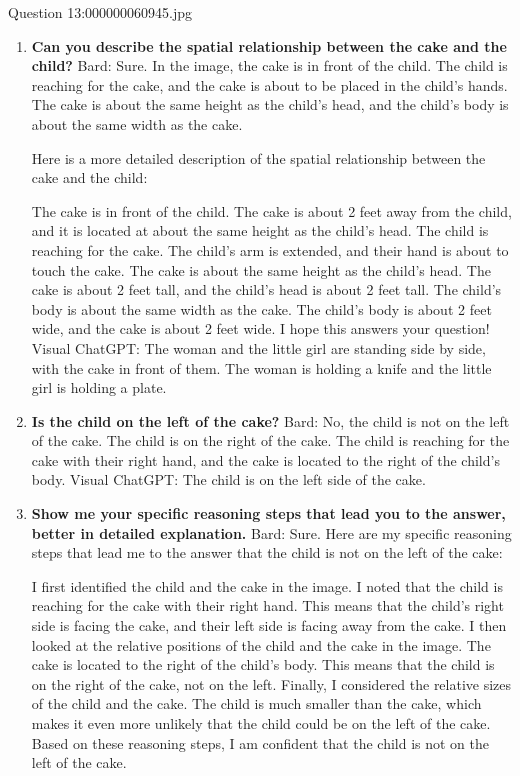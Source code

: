     Question 13:000000060945.jpg
    \begin{enumerate}
        \item \textbf{Can you describe the spatial relationship between the cake and the child?}
        \subitem 
        Bard:
        Sure. In the image, the cake is in front of the child. The child is reaching for the cake, and the cake is about to be placed in the child's hands. The cake is about the same height as the child's head, and the child's body is about the same width as the cake.

        Here is a more detailed description of the spatial relationship between the cake and the child:

        The cake is in front of the child. The cake is about 2 feet away from the child, and it is located at about the same height as the child's head.
        The child is reaching for the cake. The child's arm is extended, and their hand is about to touch the cake.
        The cake is about the same height as the child's head. The cake is about 2 feet tall, and the child's head is about 2 feet tall.
        The child's body is about the same width as the cake. The child's body is about 2 feet wide, and the cake is about 2 feet wide.
        I hope this answers your question!
        \subitem Visual ChatGPT: The woman and the little girl are standing side by side, with the cake in front of them. The woman is holding a knife and the little girl is holding a plate.
        \item \textbf{Is the child on the left of the cake?}
        \subitem Bard: No, the child is not on the left of the cake. The child is on the right of the cake. The child is reaching for the cake with their right hand, and the cake is located to the right of the child's body.
        \subitem Visual ChatGPT: The child is on the left side of the cake.
        \item \textbf{Show me your specific reasoning steps that lead you to the answer, better in detailed explanation.}
        \subitem Bard:
        Sure. Here are my specific reasoning steps that lead me to the answer that the child is not on the left of the cake:

        I first identified the child and the cake in the image.
        I noted that the child is reaching for the cake with their right hand. This means that the child's right side is facing the cake, and their left side is facing away from the cake.
        I then looked at the relative positions of the child and the cake in the image. The cake is located to the right of the child's body. This means that the child is on the right of the cake, not on the left.
        Finally, I considered the relative sizes of the child and the cake. The child is much smaller than the cake, which makes it even more unlikely that the child could be on the left of the cake.
        Based on these reasoning steps, I am confident that the child is not on the left of the cake.


\end{enumerate}
